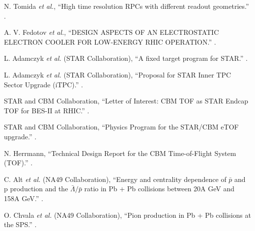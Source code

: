 \begin{thebibliography}{10}
N. Tomida {\it et al.},
\newblock ``High time resolution RPCs with different readout geometries.''
.

A. V. Fedotov {\it et al.},
\newblock ``DESIGN ASPECTS OF AN ELECTROSTATIC ELECTRON COOLER FOR
LOW-ENERGY RHIC OPERATION.''
.

L. Adamczyk {\it et al.} (STAR Collaboration),
\newblock ``A fixed target program for STAR.''
.

L. Adamczyk {\it et al.} (STAR Collaboration),
\newblock ``Proposal for STAR Inner TPC Sector Upgrade (iTPC).''
.

STAR and CBM Collaboration,
\newblock ``Letter of Interest: CBM TOF as STAR Endcap TOF for BES-II at RHIC.''
.

STAR and CBM Collaboration,
\newblock ``Physics Program for the STAR/CBM eTOF upgrade.''
.

N. Herrmann,
\newblock ``Technical Design Report for the CBM Time-of-Flight System (TOF).''
.

C. Alt {\it et al.} (NA49 Collaboration),
\newblock ``Energy and centrality dependence of $\bar{p}$ and p production and the $\bar{\Lambda}/\bar{p}$ ratio in Pb + Pb collisions between 20A GeV and 158A GeV.''
.

O. Chvala {\it et al.} (NA49 Collaboration),
\newblock ``Pion production in Pb + Pb collisions at the SPS.''
.

\end{thebibliography}
